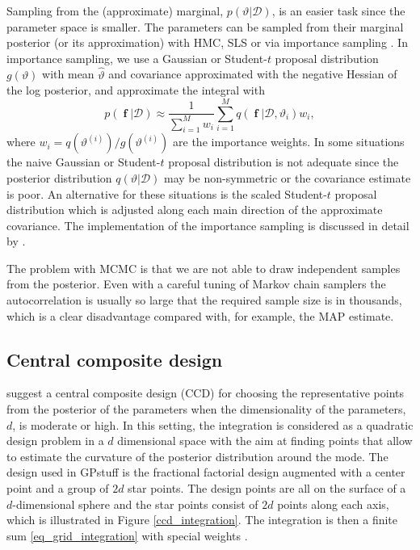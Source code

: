 \documentclass[twoside,11pt]{article}
\DeclareMathOperator{\f}{\mathbf{f}}
\newcommand{\pkg}[1]{{\fontseries{b}\selectfont #1}}
\begin{document}
Sampling from the (approximate) marginal, $p(\vartheta|\mathcal{D})$,
is an easier task since the parameter space is smaller.
%
The parameters can be sampled from their marginal posterior (or its
approximation) with HMC, SLS \citep{Neal:2003,Thompson+Neal:2010} or via importance
sampling \citep{Geweke:1989}. In importance sampling, we use a
Gaussian or Student-$t$ proposal distribution $g(\vartheta)$ with mean
$\hat{\vartheta}$ and covariance approximated with the negative
Hessian of the log posterior, and approximate the integral with
%
\begin{equation}
p(\f|\mathcal{D}) \approx \frac{1}{\sum_{i=1}^M w_i} \sum_{i=1}^M
q(\f|\mathcal{D}, \vartheta_i) w_i, 
\end{equation}
%
where $w_i = q(\vartheta^{(i)})/g(\vartheta^{(i)})$ are the importance
weights. In some situations the naive Gaussian or Student-$t$ proposal
distribution is not adequate since the posterior distribution
$q(\vartheta|\mathcal{D})$ may be non-symmetric or the covariance
estimate is poor. An alternative for these situations is the scaled
Student-$t$ proposal distribution \citep{Geweke:1989} which is
adjusted along each main direction of the approximate covariance. The
implementation of the importance sampling is discussed in detail by
\citet{Vanhatalo+Pietilainen+Vehtari:2010}.

The problem with MCMC is that we are not able to draw independent
samples from the posterior. Even with a careful tuning of Markov chain
samplers the autocorrelation is usually so large that the required
sample size is in thousands, which is a clear disadvantage compared
with, for example, the MAP estimate.

\subsection{Central composite design}\label{sec_CCD_integration}

\citet{Rue+Martino+Chopin:2009} suggest a central composite design
(CCD) for choosing the representative points from the posterior of the
parameters when the dimensionality of the parameters, $d$, is moderate
or high. In this setting, the integration is considered as a quadratic
design problem in a $d$ dimensional space with the aim at finding
points that allow to estimate the curvature of the posterior
distribution around the mode. The design used in \pkg{GPstuff} is the
fractional factorial design \citep{Sanchez+Sanchez:2005} augmented
with a center point and a group of $2d$ star points.  The design
points are all on the surface of a $d$-dimensional sphere and the star
points consist of $2d$ points along each axis, which is illustrated in
Figure \ref{ccd_integration}.  The integration is then a finite sum
\eqref{eq_grid_integration} with special weights
\citep{Vanhatalo+Pietilainen+Vehtari:2010}.
\end{document}
